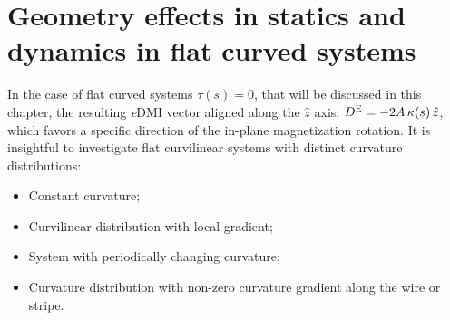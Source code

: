 \documentclass[showpacs,amsmath,amssymb,aps,pra,longbibliography,
10pt,preprint,superscriptaddress,showkeys]{revtex4-1}
\begin{document}


\section{Geometry effects in statics and dynamics in flat curved systems}\label{sec:effects_1D}
In the case of flat curved systems $\tau(s)=0$, that will be discussed in this chapter, the resulting \textit{e}DMI vector aligned along the $\hat{z}$ axis: $D^\textsc{E} = - 2 A \, \kappa(s) \, \hat{z}$, which favors a specific direction of the in-plane magnetization rotation. It is insightful to investigate flat curvilinear systems with distinct curvature distributions: 
\begin{itemize}
	\item Constant curvature;
	\item Curvilinear distribution with local gradient;
	\item System with periodically changing curvature;
	\item Curvature distribution with non-zero curvature gradient along the wire or stripe. 
\end{itemize}
\end{document}
